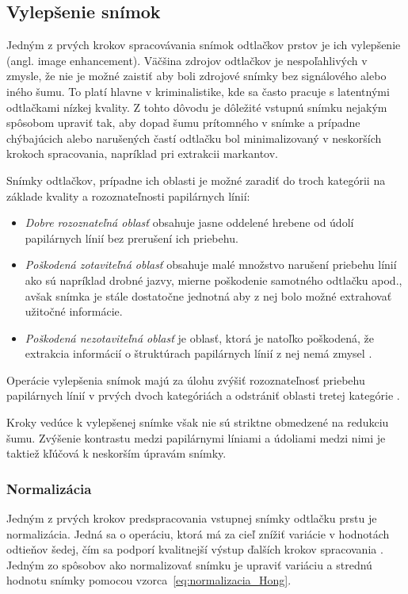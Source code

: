 
  \subsection{Vylepšenie snímok} \label{sec:vylepsenie_snimok}
  Jedným z prvých krokov spracovávania snímok odtlačkov prstov je ich vylepšenie (angl. image enhancement). Väčšina zdrojov odtlačkov je nespoľahlivých
  v zmysle, že nie je možné zaistiť aby boli zdrojové snímky bez signálového alebo iného šumu. To platí hlavne v kriminalistike,
  kde sa často pracuje s latentnými odtlačkami nízkej kvality. Z tohto dôvodu je dôležité vstupnú snímku nejakým spôsobom upraviť tak,
  aby dopad šumu prítomného v snímke a prípadne chýbajúcich alebo narušených častí odtlačku bol minimalizovaný v neskorších krokoch spracovania,
  napríklad pri extrakcii markantov.

  Snímky odtlačkov, prípadne ich oblasti je možné zaradiť do troch kategórii na základe kvality a rozoznateľnosti papilárnych línií:
  \begin{itemize}
    \item \emph{Dobre rozoznateľná oblasť} obsahuje jasne oddelené hrebene od údolí papilárnych línií bez prerušení ich priebehu.
    \item \emph{Poškodená zotaviteľná oblasť} obsahuje malé množstvo narušení priebehu línií ako sú napríklad drobné jazvy, mierne poškodenie
          samotného odtlačku apod., avšak snímka je stále dostatočne jednotná aby z nej bolo možné extrahovať užitočné informácie.
    \item \emph{Poškodená nezotaviteľná oblasť} je oblasť, ktorá je natoľko poškodená, že extrakcia informácií o štruktúrach papilárnych línií
          z nej nemá zmysel \cite{Hong}.
  \end{itemize}
  Operácie vylepšenia snímok majú za úlohu zvýšiť rozoznateľnosť priebehu papilárnych línií v prvých dvoch kategóriách a odstrániť oblasti tretej
  kategórie \cite{Hong}.
  
  Kroky vedúce k vylepšenej snímke však nie sú striktne obmedzené na redukciu šumu. Zvýšenie kontrastu medzi papilárnymi líniami a údoliami medzi nimi
  je taktiež kľúčová k neskorším úpravám snímky.

  \subsubsection{Normalizácia} \label{sec:normalizacia}
  Jedným z prvých krokov predspracovania vstupnej snímky odtlačku prstu je normalizácia. Jedná sa o operáciu, ktorá má za cieľ znížiť variácie
  v hodnotách odtieňov šedej, čím sa podporí kvalitnejší výstup ďalších krokov spracovania \cite{Hong}. Jedným zo spôsobov ako normalizovať
  snímku je upraviť variáciu a strednú hodnotu snímky pomocou vzorca~{\ref{eq:normalizacia_Hong}}.

